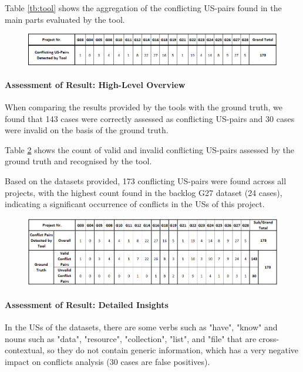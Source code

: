 Table \ref{tb:tool} shows the aggregation of the conflicting US-pairs found in the main parts evaluated by the tool.
\begin{figure}[h]
	\begingroup
	\scriptsize
	\centering
	\includegraphics[scale=0.55]{Table/conflict_tool.png}
	\label{tb:conflict_tool}
	\endgroup
\end{figure}
\paragraph{Assessment of Result: High-Level Overview}When comparing the results provided by the tools with the ground truth, we found that 143 cases were correctly assessed as conflicting US-pairs and 30 cases were invalid on the basis of the ground truth.

Table \ref{tb:conflict_difference} shows the count of valid and invalid conflicting US-pairs assessed by the ground truth and recognised by the tool.

Based on the datasets provided, 173 conflicting US-pairs were found across all projects, with the highest count found in the backlog G27 dataset (24 cases), indicating a significant occurrence of conflicts in the USs of this project.
\begin{figure}[h]
	\begingroup
	\scriptsize
	\centering
	\includegraphics[scale=0.55]{Table/conflict_difference.png}
	\label{tb:conflict_difference}
	
	\endgroup
\end{figure}
\paragraph{Assessment of Result: Detailed Insights}In the USs of the datasets, there are some verbs such as "have", "know" and nouns such as "data", "resource", "collection", "list", and "file" that are cross-contextual, so they do not contain generic information, which has a very negative impact on conflicts analysis (30 cases are false positives).

